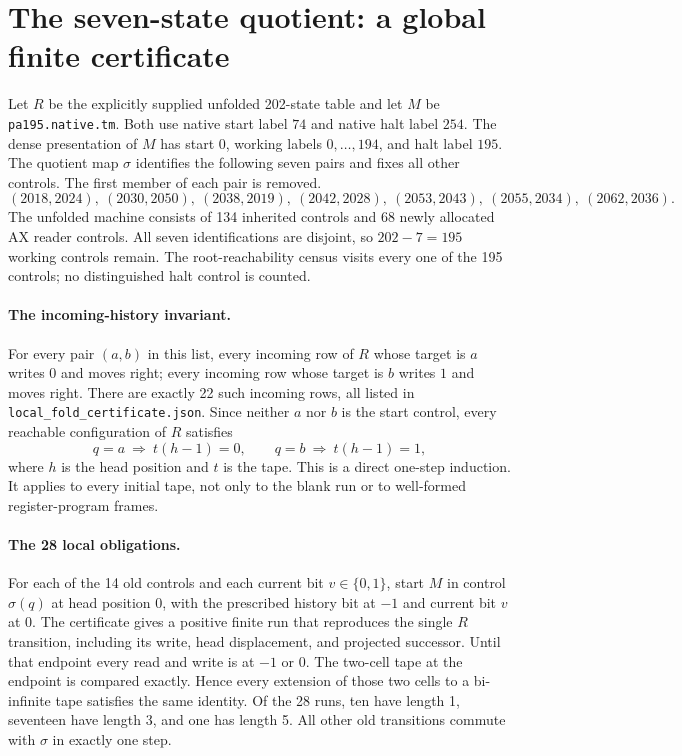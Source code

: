 \section{The seven-state quotient: a global finite certificate}

Let $R$ be the explicitly supplied unfolded 202-state table and let $M$
be \texttt{pa195.native.tm}.  Both use native start label $74$ and native
halt label $254$.  The dense presentation of $M$ has start $0$, working
labels $0,\ldots,194$, and halt label $195$.
The quotient map $\sigma$ identifies the following seven pairs and fixes
all other controls.  The first member of each pair is removed.
\[
 (2018,2024),\ (2030,2050),\ (2038,2019),\ (2042,2028),\
 (2053,2043),\ (2055,2034),\ (2062,2036).
\]
The unfolded machine consists of 134 inherited controls and 68 newly
allocated AX reader controls.  All seven identifications are disjoint, so
$202-7=195$ working controls remain.  The root-reachability census visits
every one of the 195 controls; no distinguished halt control is counted.

\paragraph{The incoming-history invariant.}
For every pair $(a,b)$ in this list, every incoming row of $R$ whose target
is $a$ writes $0$ and moves right; every incoming row whose target is $b$
writes $1$ and moves right.  There are exactly 22 such incoming rows, all
listed in \texttt{local\_fold\_certificate.json}.  Since neither $a$ nor
$b$ is the start control, every reachable configuration of $R$ satisfies
\[
 q=a\ \Longrightarrow\ t(h-1)=0,
 \qquad
 q=b\ \Longrightarrow\ t(h-1)=1,
\]
where $h$ is the head position and $t$ is the tape.  This is a direct
one-step induction.  It applies to every initial tape, not only to the
blank run or to well-formed register-program frames.

\paragraph{The 28 local obligations.}
For each of the 14 old controls and each current bit $v\in\{0,1\}$,
start $M$ in control $\sigma(q)$ at head position $0$, with the prescribed
history bit at $-1$ and current bit $v$ at $0$.
The certificate gives a positive finite run that reproduces the single
$R$ transition, including its write, head displacement, and projected
successor.  Until that endpoint every read and write is at $-1$ or $0$.
The two-cell tape at the endpoint is compared exactly.  Hence every
extension of those two cells to a bi-infinite tape satisfies the same
identity.  Of the 28 runs, ten have length 1, seventeen have length 3,
and one has length 5.  All other old transitions commute with $\sigma$
in exactly one step.

